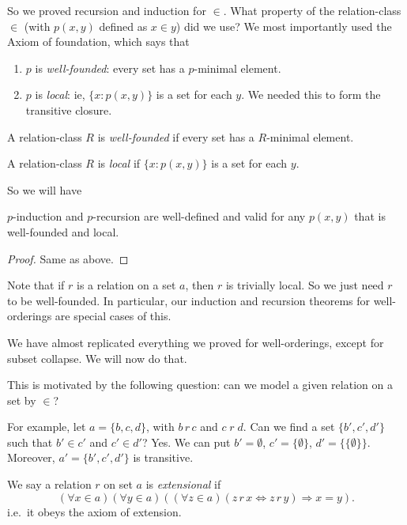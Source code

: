 \documentclass[a4paper]{article}
\begin{document}
So we proved recursion and induction for $\in$. What property of the relation-class $\in$ (with $p(x, y)$ defined as $x\in y$) did we use? We most importantly used the Axiom of foundation, which says that
\begin{enumerate}
  \item $p$ is \emph{well-founded}: every set has a $p$-minimal element.
  \item $p$ is \emph{local}: ie, $\{x: p(x, y)\}$ is a set for each $y$. We needed this to form the transitive closure.
\end{enumerate}

\begin{defi}
  A relation-class $R$ is \emph{well-founded} if every set has a $R$-minimal element.
\end{defi}

\begin{defi}
  A relation-class $R$ is \emph{local} if $\{x: p(x, y)\}$ is a set for each $y$.
\end{defi}

So we will have
\begin{prop}
  $p$-induction and $p$-recursion are well-defined and valid for any $p(x, y)$ that is well-founded and local.
\end{prop}

\begin{proof}
  Same as above.
\end{proof}
Note that if $r$ is a relation on a set $a$, then $r$ is trivially local. So we just need $r$ to be well-founded. In particular, our induction and recursion theorems for well-orderings are special cases of this.

We have almost replicated everything we proved for well-orderings, except for subset collapse. We will now do that.

This is motivated by the following question: can we model a given relation on a set by $\in$?

For example, let $a = \{b, c, d\}$, with $b\,r\,c$ and $c\;r\;d$. Can we find a set $\{b', c', d'\}$ such that $b'\in c'$ and $c'\in d'$? Yes. We can put $b' = \emptyset$, $c' = \{\emptyset\}$, $d' = \{\{\emptyset\}\}$. Moreover, $a' = \{b', c', d'\}$ is transitive.

\begin{defi}
  We say a relation $r$ on set $a$ is \emph{extensional} if
  \[
    (\forall x\in a)(\forall y\in a)((\forall z\in a)(z\,r\,x \Leftrightarrow z\,r\,y)\Rightarrow x = y).
  \]
  i.e.\ it obeys the axiom of extension.
\end{defi}
\end{document}
